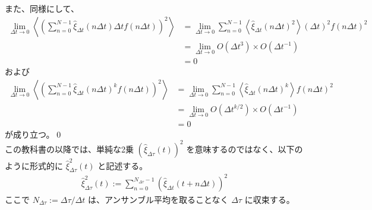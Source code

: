 \documentclass[a4paper,11pt]{jsarticle}
\numberwithin{equation}{section}
\begin{document}
また、同様にして、
\begin{align}
\lim_{\Delta t \to 0} 
\left\langle 
\left( \sum_{n=0}^{N-1} \hat{\xi}_{\Delta t}(n \Delta t) \Delta t f(n \Delta t) \right)^2 
\right\rangle 
&= \lim_{\Delta t \to 0} 
\sum_{n=0}^{N-1} 
\left\langle \hat{\xi}_{\Delta t}(n \Delta t)^2 \right\rangle 
(\Delta t)^2 f(n \Delta t)^2 \\
&= \lim_{\Delta t \to 0} 
O(\Delta t^3) \times O(\Delta t^{-1})  \\
&= 0 
\end{align}
および
\begin{align}
\lim_{\Delta t \to 0}
\left\langle
\left( \sum_{n=0}^{N-1} \hat{\xi}_{\Delta t}(n \Delta t)^k f(n \Delta t) \right)^2
\right\rangle
&= \lim_{\Delta t \to 0}
\sum_{n=0}^{N-1}
\left\langle \hat{\xi}_{\Delta t}(n \Delta t)^k \right\rangle f(n \Delta t)^2 \\
&= \lim_{\Delta t \to 0}
O(\Delta t^{k/2}) \times O(\Delta t^{-1}) \\
&= 0
\end{align}
が成り立つ。\qed\\

この教科書の以降では、単純な2乗 \((\hat{\xi}_{\Delta \tau}(t))^2\) を意味するのではなく、以下のように形式的に \(\hat{\xi}_{\Delta \tau}^2(t)\) と記述する。
\begin{align}
\hat{\xi}_{\Delta \tau}^2(t) := \sum_{n=0}^{N_{\Delta \tau} - 1} \left( \hat{\xi}_{\Delta t}(t + n\Delta t) \right)^2
\end{align}
ここで \(N_{\Delta \tau} := \Delta \tau / \Delta t\) は、アンサンブル平均を取ることなく \(\Delta \tau\) に収束する。
\end{document}
